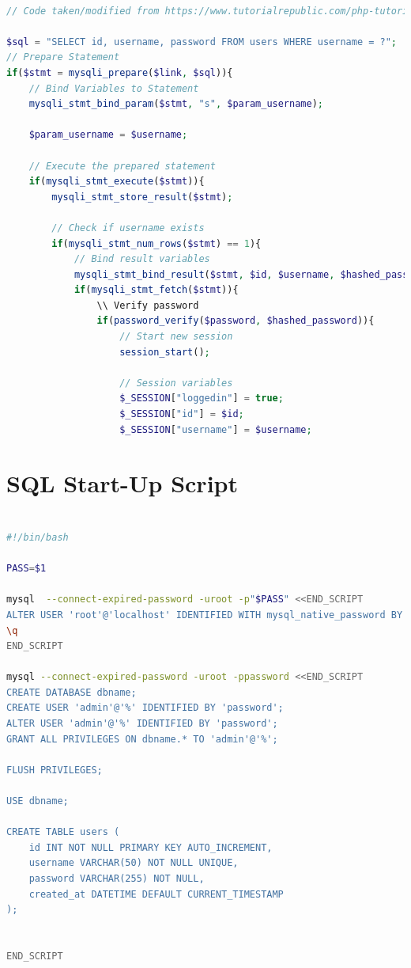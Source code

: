 \documentclass[msc,deptreport, cs]{infthesis} %
\begin{document}
\begin{lstlisting}[language=php, breaklines=true]

// Code taken/modified from https://www.tutorialrepublic.com/php-tutorial/php-mysql-login-system.php

$sql = "SELECT id, username, password FROM users WHERE username = ?";
// Prepare Statement
if($stmt = mysqli_prepare($link, $sql)){
    // Bind Variables to Statement
    mysqli_stmt_bind_param($stmt, "s", $param_username);

    $param_username = $username;

    // Execute the prepared statement
    if(mysqli_stmt_execute($stmt)){
        mysqli_stmt_store_result($stmt);

        // Check if username exists
        if(mysqli_stmt_num_rows($stmt) == 1){
            // Bind result variables
            mysqli_stmt_bind_result($stmt, $id, $username, $hashed_password);
            if(mysqli_stmt_fetch($stmt)){
                \\ Verify password
                if(password_verify($password, $hashed_password)){
                    // Start new session
                    session_start();

                    // Session variables
                    $_SESSION["loggedin"] = true;
                    $_SESSION["id"] = $id;
                    $_SESSION["username"] = $username;

\end{lstlisting}


\section{SQL Start-Up Script}


\begin{lstlisting}[language=bash, breaklines=true]

#!/bin/bash

PASS=$1

mysql  --connect-expired-password -uroot -p"$PASS" <<END_SCRIPT
ALTER USER 'root'@'localhost' IDENTIFIED WITH mysql_native_password BY 'password';
\q
END_SCRIPT

mysql --connect-expired-password -uroot -ppassword <<END_SCRIPT
CREATE DATABASE dbname;
CREATE USER 'admin'@'%' IDENTIFIED BY 'password';
ALTER USER 'admin'@'%' IDENTIFIED BY 'password';
GRANT ALL PRIVILEGES ON dbname.* TO 'admin'@'%';

FLUSH PRIVILEGES;

USE dbname;

CREATE TABLE users (
    id INT NOT NULL PRIMARY KEY AUTO_INCREMENT,
    username VARCHAR(50) NOT NULL UNIQUE,
    password VARCHAR(255) NOT NULL,
    created_at DATETIME DEFAULT CURRENT_TIMESTAMP
);


END_SCRIPT

\end{lstlisting}

% 
\end{document}
